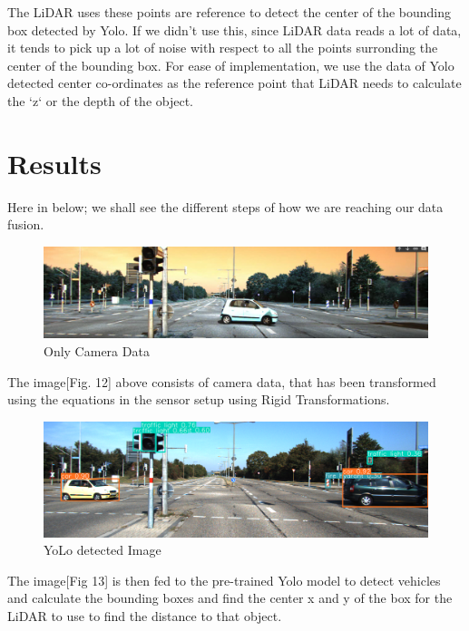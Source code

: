 \documentclass[letterpaper, 10 pt, conference]{ieeeconf}  %
\begin{document}
The LiDAR uses these points are reference to detect the center of the bounding box detected by Yolo.
If we didn't use this, since LiDAR data reads a lot of data, it tends to pick up a lot of noise with respect to all the points surronding the center of the bounding box.
For ease of implementation, we use the data of Yolo detected center co-ordinates as the reference point that LiDAR needs to calculate the `z` or the depth of the object.



\section{Results}

Here in below; we shall see the different steps of how we are reaching our data fusion.
\begin{figure}[htbp]
  \centering
  \includegraphics[width=\linewidth]{OnlyCamera.png}
  \caption{Only Camera Data}
  \label{Only Camera Data}
\end{figure}

The image[Fig. 12] above consists of camera data, that has been transformed using the equations in the sensor setup using Rigid Transformations.

\begin{figure}[htbp]
  \centering
  \includegraphics[width=\linewidth]{YoloDetectedImage.png}
  \caption{YoLo detected Image}
  \label{YoLo detected Image}
\end{figure}

The image[Fig 13] is then fed to the pre-trained Yolo model to detect vehicles and calculate the bounding boxes and find the center x and y of the box for the LiDAR to use to find the distance to that object.
\end{document}
